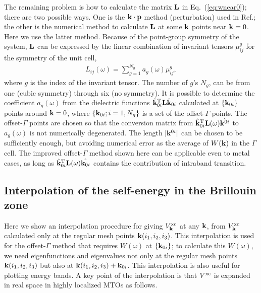 \documentclass[a4paper,10pt,epsf,fleqn]{article}
\def\vxc{V^{\rm xc}}
\def\bfp{{\bf p}}
\newcommand{\bfq}{{\bf q}}
\newcommand{\bfk}{{\bf k}}
\newcommand{\req}[1]{\mbox{Eq.~(\ref{#1})}}
\begin{document}
The remaining problem is how to calculate
the matrix ${\bf L}$ in \req{eq:wnear0}; there are two possible ways.
One is the $\bfk \cdot \bfp$ method (perturbation) used in Ref.\cite{friedrich_efficient_2010}; 
the other is the numerical method to calculate ${\bf L}$ at some
$\bfk$ points near $\bfk=0$. Here we use the latter method.
Because of the point-group symmetry of the system, ${\bf L}$ can be expressed by the
linear combination of invariant tensors $\mu_{ij}^g$ for the symmetry of the unit cell,
\begin{eqnarray}
L_{ij}(\omega)=  \sum_{g=1}^{N_g} a_g(\omega) \mu_{ij}^g,
\end{eqnarray}
where $g$ is the index of the invariant tensor. 
The number of $g$'s $N_g$, can be
from one (cubic symmetry) through six (no symmetry).
It is possible to determine the coefficient $a_g(\omega)$
from the dielectric functions ${\hat{\bfk}_{0i}}^{\rm T}{\bf L}\hat{\bfk}_{0i}$
calculated at $\{\bfk_{0i}\}$ points around
$\bfk=0$, where $\{\bfk_{0i}; i=1,N_g\}$ is a set of the offset-$\Gamma$ points.
The offset-$\Gamma$ points are chosen so that the conversion matrix
from $\hat{\bfk}_{0i}^{\rm T}{\bf L}(\omega)\hat{\bfk^{0i}}$ to $a_g(\omega)$
is not numerically degenerated. The length $|\bfk^{0i}|$
can be chosen to be sufficiently enough, but avoiding numerical error
%
as the average of $W(\bfk)$ in the $\Gamma$ cell.
The improved offset-$\Gamma$ method shown here can be applicable even to metal cases, as long as
$\hat{\bfk}_{0i}^{\rm T}{\bf L}(\omega)\hat{\bfk_{0i}}$ contains the contribution
of intraband transition.


\subsection{Interpolation of the self-energy in the Brillouin zone}
\label{sec:siginterp}
Here we show 
an interpolation procedure for giving
$\vxc_{\bfk}$ at any $\bfk$,
from $\vxc_{\bfk}$ calculated only at the regular mesh points $\bfk(i_1,i_2,i_3)$.
This interpolation is used for the offset-$\Gamma$ method that
requires $W(\omega)$ at $\{\bfk_{0i}\}$;
to calculate this $W(\omega)$, we need 
eigenfunctions and eigenvalues not only 
at the regular mesh points $\bfk(i_1,i_2,i_3)$
but also at $\bfk(i_1,i_2,i_3)+\bfk_{0i}$. 
This interpolation is also useful for plotting
energy bands. %
A key point of the interpolation is that $\vxc$ 
is expanded in real space in highly localized MTOs as follows.
\end{document}
